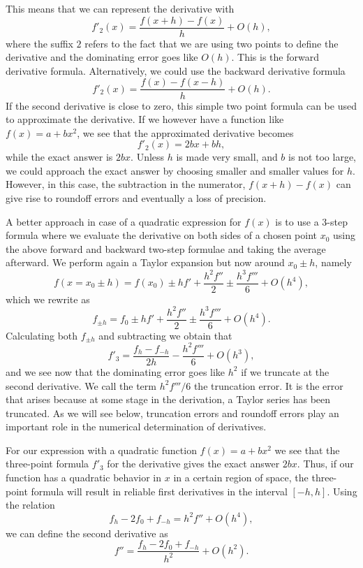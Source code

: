 This means that we can represent the derivative with
%
\[
    f'_{2}(x)= \frac{f(x+h)-f(x)}{h}+O(h),
\]
%
where the suffix $2$ refers to the fact that we are using
two points to define the derivative and the dominating error goes
like $O(h)$. This is the forward derivative formula. Alternatively,
we could use the backward derivative formula
\[
    f'_{2}(x)= \frac{f(x)-f(x-h)}{h}+O(h).
\]
If the second derivative is close to zero, this simple two point
formula can be used  to approximate the derivative.
If we however have a function like 
$f(x)=a+bx^2$, we see that the approximated
derivative becomes
%
\[
    f'_{2}(x) = 2bx+bh,
\]
%
while the exact answer is $2bx$. Unless $h$ is made very small,
and $b$ is not too large, we could approach the exact answer
by choosing smaller and smaller values for $h$. However,
in this case, the subtraction in the numerator, $f(x+h)-f(x)$
can give rise to roundoff errors and eventually a loss of precision. 

A better approach in case of a quadratic expression for 
$f(x)$ is to use a 3-step formula where we evaluate the derivative
on both sides of a chosen point $x_0$ using the above forward and backward 
two-step
formulae  
and taking the average afterward. We perform again
a  Taylor expansion but now around $x_0\pm h$, namely
%
\begin{equation} \label{eq:htaylor}
  f(x=x_0\pm h)=f(x_0)\pm hf'+\frac{h^2f''}{2}\pm\frac{h^3f'''}{6} +O(h^4),
\end{equation}
%
which we rewrite as
%
\[
  f_{\pm h}=f_0\pm hf'+\frac{h^2f''}{2}\pm\frac{h^3f'''}{6} +O(h^4).
\]
%
Calculating both $f_{\pm h}$  and subtracting we obtain that
%
\[
   f'_{3}=\frac{f_h-f_{-h}}{2h} - \frac{h^2f'''}{6} +O(h^3),
\]
%
and we see now that the dominating error goes like $h^2$ if we truncate
at the second derivative. We call the term 
$h^2f'''/6$ the truncation error. It is the error that arises because
at some stage in the derivation, a Taylor series has been truncated. 
As we will see below, truncation errors and roundoff errors play an
important role in the numerical determination of derivatives.

For our expression with a quadratic function $f(x)=a+bx^2$ we
see that the three-point formula $f'_{3}$
for the derivative gives the exact answer $2bx$.
Thus, if our function has a quadratic behavior in $x$ in a certain
region of space, the three-point formula will result in reliable
first derivatives in the interval $[-h,h]$. Using the relation 
\[
  f_h -2f_0 +f_{-h}=h^2f''+O(h^4),
\]
we can define the second derivative as
\[
  f''=\frac{f_h -2f_0 +f_{-h}}{h^2} +O(h^2).
\]

